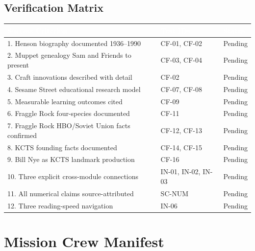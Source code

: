 \documentclass[11pt,letterpaper]{article}
\newcommand{\tableheader}[1]{\textbf{\sffamily\textcolor{white}{#1}}}
\begin{document}
\subsection{Verification Matrix}

\begin{center}
\begin{tabularx}{\textwidth}{XL{3.5cm}C{1.5cm}}
\toprule
{}
\tableheader{Success Criterion} & \tableheader{Test IDs} & \tableheader{Status} \\
. Henson biography documented 1936--1990 & CF-01, CF-02 & Pending \\
2. Muppet genealogy Sam and Friends to present & CF-03, CF-04 & Pending \\
3. Craft innovations described with detail & CF-02 & Pending \\
4. Sesame Street educational research model & CF-07, CF-08 & Pending \\
5. Measurable learning outcomes cited & CF-09 & Pending \\
6. Fraggle Rock four-species documented & CF-11 & Pending \\
7. Fraggle Rock HBO/Soviet Union facts confirmed & CF-12, CF-13 & Pending \\
8. KCTS founding facts documented & CF-14, CF-15 & Pending \\
9. Bill Nye as KCTS landmark production & CF-16 & Pending \\
10. Three explicit cross-module connections & IN-01, IN-02, IN-03 & Pending \\
11. All numerical claims source-attributed & SC-NUM & Pending \\
12. Three reading-speed navigation & IN-06 & Pending \\
\bottomrule
\end{tabularx}
\end{center}

\section{Mission Crew Manifest}
\end{document}
